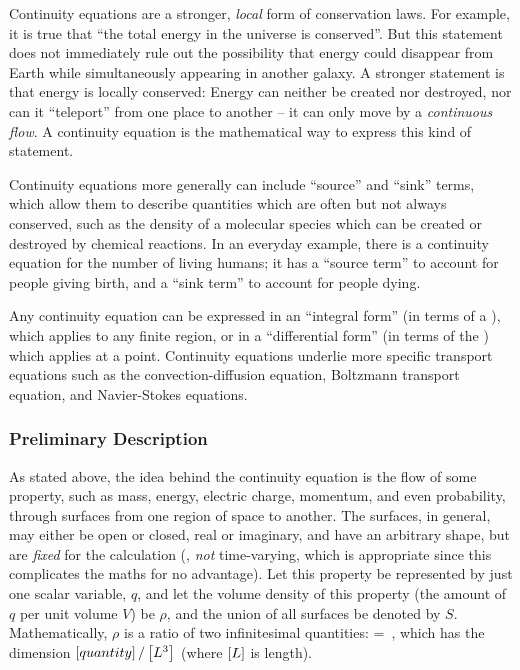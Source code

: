 Continuity equations are a stronger, \emph{local} form of conservation laws. For example, it is true that ``the total energy in the universe is conserved''. But this statement does not immediately rule out the possibility that energy could disappear from Earth while simultaneously appearing in another galaxy. A stronger statement is that energy is locally conserved: Energy can neither be created nor destroyed, nor can it ``teleport'' from one place to another -- it can only move by a \emph{continuous flow}. A continuity equation is the mathematical way to express this kind of statement.

Continuity equations more generally can include ``source'' and ``sink'' terms, which allow them to describe quantities which are often but not always conserved, such as the density of a molecular species which can be created or destroyed by chemical reactions. In an everyday example, there is a continuity equation for the number of living humans; it has a ``source term'' to account for people giving birth, and a ``sink term'' to account for people dying.

Any continuity equation can be expressed in an ``integral form'' (in terms of a ), which applies to any finite region, or in a ``differential form'' (in terms of the ) which applies at a point.
Continuity equations underlie more specific transport equations such as the convection-diffusion equation, Boltzmann transport equation, and Navier-Stokes equations.


\subsubsection{Preliminary Description}
As stated above, the idea behind the continuity equation is the flow of some property, such as mass, energy, electric charge, momentum, and even probability, through surfaces from one region of space to another. The surfaces, in general, may either be open or closed, real or imaginary, and have an arbitrary shape, but are \emph{fixed} for the calculation (\ie, \emph{not} time-varying, which is appropriate since this complicates the maths for no advantage). Let this property be represented by just one scalar variable, $q$, and let the volume density of this property (the amount of $q$ per unit volume $V$) be $\rho$, and the union of all surfaces be denoted by $S$. Mathematically, $\rho$ is a ratio of two infinitesimal quantities:
\beq
\rho = \,,
\eeq
which has the dimension $\left[{quantity}\right]/\left[{L^3}\right]$ (where $\left[{L}\right]$ is length).

